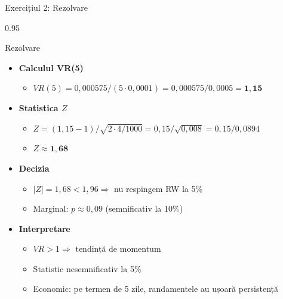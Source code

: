 \documentclass[9pt, aspectratio=169, t]{beamer}
\begin{document}
\begin{frame}[shrink=15]{Exercițiul 2: Rezolvare}
\begin{cminipage}{0.95\textwidth}
\begin{exampleblock}{Rezolvare}
\begin{itemize}\setlength{\itemsep}{0pt}
    \item \textbf{Calculul VR(5)}
    \begin{itemize}\setlength{\itemsep}{0pt}
        \item $VR(5) = 0{,}000575/(5 \cdot 0{,}0001) = 0{,}000575/0{,}0005 = \mathbf{1{,}15}$
    \end{itemize}
    \item \textbf{Statistica $Z$}
    \begin{itemize}\setlength{\itemsep}{0pt}
        \item $Z = (1{,}15 - 1)/\sqrt{2 \cdot 4/1000} = 0{,}15/\sqrt{0{,}008} = 0{,}15/0{,}0894$
        \item $Z \approx \mathbf{1{,}68}$
    \end{itemize}
    \item \textbf{Decizia}
    \begin{itemize}\setlength{\itemsep}{0pt}
        \item $|Z| = 1{,}68 < 1{,}96 \Rightarrow$ nu respingem RW la 5\%
        \item Marginal: $p \approx 0{,}09$ (semnificativ la 10\%)
    \end{itemize}
    \item \textbf{Interpretare}
    \begin{itemize}\setlength{\itemsep}{0pt}
        \item $VR > 1 \Rightarrow$ tendință de momentum
        \item Statistic nesemnificativ la 5\%
        \item Economic: pe termen de 5 zile, randamentele au ușoară persistență
    \end{itemize}
\end{itemize}
\end{exampleblock}
\end{cminipage}
\end{frame}
\end{document}
